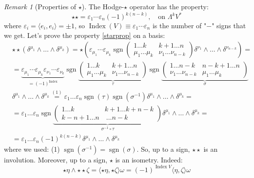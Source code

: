 \documentclass[a4paper,11pt,titlepage, article, oneside]{memoir}
\numberwithin{equation}{section}
\theoremstyle{definition}
\theoremstyle{remark}
\newtheorem{remark}[theorem]{Remark}
\DeclareMathOperator{\Index}{Index}
\DeclareMathOperator{\sgn}{sgn}
\begin{document}
\begin{remarkbox}\begin{remark}[Properties of $\star$]
The Hodge-$\star$ operator has the property:
\begin{equation} \label{starprop}
\star \star = \varepsilon_1 \cdots \varepsilon_n (-1)^{k(n-k)}, \quad \text{on } \Lambda^k V^*
\end{equation}
where $\varepsilon_i = \langle e_i, e_i \rangle = \pm 1$, so $\Index(V) \equiv \varepsilon_1 \cdots \varepsilon_n$ is the number of "$-$" signs that we get. Let's prove the property \eqref{starprop} on a basis:
\begin{align*}
& \star \star (\delta^{\mu_1} \wedge \ldots \wedge \delta^{\mu_k}) = \star \left ( \varepsilon_{\mu_1} \cdots \varepsilon_{\mu_k} \sgn \left(
\begin{matrix}
1\ldots k &k+1\ldots n \\
\mu_1\ldots \mu_k & \nu_1 \ldots \nu_{n-k}
\end{matrix}
\right)  \delta^{\nu_1} \wedge \ldots \wedge \delta^{\nu_{n-k}}\right) = \\
&= \underbrace{\varepsilon_{\mu_1} \cdots \varepsilon_{\mu_k} \varepsilon_{\nu_1} \cdots \varepsilon_{\nu_k}}_{=(-1)^{\Index}} \sgn \underbrace{ \left( 
\begin{matrix}
1\ldots k &k+1\ldots n \\
\mu_1\ldots \mu_k & \nu_1 \ldots \nu_{n-k}
\end{matrix}
\right)}_{\tau} \sgn \underbrace{ \left( 
\begin{matrix}
1\ldots n-k &n-k+1\ldots n \\
\nu_1 \ldots \nu_{n-k}& \mu_1 \ldots \mu_{k}
\end{matrix} 
\right)}_{\sigma} \\
& \delta^{\mu_1} \wedge \ldots \wedge \delta^{\mu_k} \overset{(1)}{=}  \varepsilon_1 \ldots \varepsilon_n \sgn (\tau) \sgn(\sigma^{-1}) \delta^{\mu_1} \wedge \ldots \wedge \delta^{\mu_k} = \\
&=  \varepsilon_1 \ldots \varepsilon_n \sgn \underbrace{ \left (
\begin{matrix}
1 \ldots k & k+1 \ldots k+n-k \\
k -n+1 \ldots n & \ \ldots n-k
\end{matrix} \right)
}_{\sigma^{-1} \circ \tau} \delta^{\mu_1} \wedge \ldots \wedge \delta^{\mu_k}  = \\
&= \varepsilon_1 \ldots \varepsilon_n (-1)^{k(n-k)} \delta^{\mu_1} \wedge \ldots \wedge \delta^{\mu_k}
\end{align*}
where we used: (1) $\sgn(\sigma^{-1}) = \sgn(\sigma)$. So, up to a sign, $\star \star$ is an involution. Moreover, up to a sign, $\star$ is an isometry. Indeed:
$$\star \eta \wedge \star \star \zeta = \langle \star \eta , \star \zeta \rangle \omega = (-1)^{\Index V} \langle \eta, \zeta \rangle \omega$$
\end{remark}\end{remarkbox}
\end{document}
